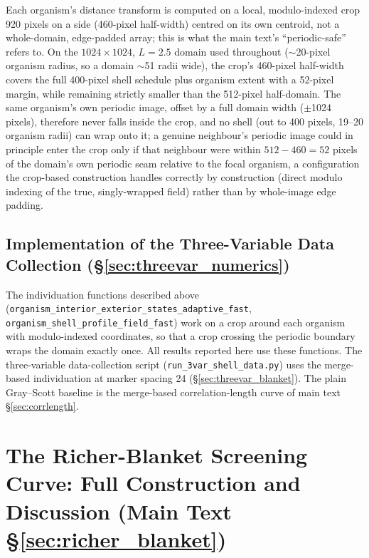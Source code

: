 \documentclass[11pt]{article}
\begin{document}
Each organism's distance transform is computed on a local, modulo-indexed crop 920 pixels on a side (460-pixel half-width) centred on its own centroid, not a whole-domain, edge-padded array; this is what the main text's ``periodic-safe'' refers to. On the $1024\times1024$, $L=2.5$ domain used throughout ($\sim$20-pixel organism radius, so a domain $\sim$51 radii wide), the crop's 460-pixel half-width covers the full 400-pixel shell schedule plus organism extent with a 52-pixel margin, while remaining strictly smaller than the 512-pixel half-domain. The same organism's own periodic image, offset by a full domain width ($\pm$1024 pixels), therefore never falls inside the crop, and no shell (out to 400 pixels, 19--20 organism radii) can wrap onto it; a genuine neighbour's periodic image could in principle enter the crop only if that neighbour were within $512-460=52$ pixels of the domain's own periodic seam relative to the focal organism, a configuration the crop-based construction handles correctly by construction (direct modulo indexing of the true, singly-wrapped field) rather than by whole-image edge padding.

\subsection{Implementation of the Three-Variable Data Collection (\S\ref{sec:threevar_numerics})}
\label{sec:S_threevar_impl}

The individuation functions described above (\texttt{organism\_\allowbreak interior\_\allowbreak exterior\_\allowbreak states\_\allowbreak adaptive\_\allowbreak fast}, \texttt{organism\_\allowbreak shell\_\allowbreak profile\_\allowbreak field\_\allowbreak fast}) work on a crop around each organism with modulo-indexed coordinates, so that a crop crossing the periodic boundary wraps the domain exactly once. All results reported here use these functions. The three-variable data-collection script (\texttt{run\_3var\_shell\_data.py}) uses the merge-based individuation at marker spacing 24 (\S\ref{sec:threevar_blanket}). The plain Gray--Scott baseline is the merge-based correlation-length curve of main text \S\ref{sec:corrlength}.

\section{The Richer-Blanket Screening Curve: Full Construction and Discussion (Main Text \S\ref{sec:richer_blanket})}
\label{sec:S_richer_blanket}
\end{document}
